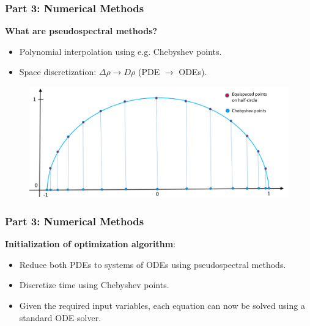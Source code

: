 \documentclass[aspectratio=169,xcolor=dvipsnames]{beamer}
\begin{document}
\begin{frame}
	\frametitle{Part 3: Numerical Methods}
	\textbf{What are pseudospectral methods?}\\
	\begin{itemize}
		\item Polynomial interpolation using e.g. Chebyshev points.
		\item Space discretization: $\Delta \rho \to D \rho$ (PDE $\to$ ODEs).
	\end{itemize}	
	\begin{figure}
		\includegraphics[width=12cm]{chebnodes1.png}\\
	\end{figure}

\end{frame}

\begin{frame}
	\frametitle{Part 3: Numerical Methods}
	\textbf{Initialization of optimization algorithm}:\\
	\vspace{0.3 cm}
    \begin{itemize}
    	\item Reduce both PDEs to systems of ODEs using pseudospectral methods.
    	\item Discretize time using Chebyshev points.
    	\item Given the required input variables, each equation can now be solved using a standard ODE solver.
    \end{itemize}
	
\end{frame}
\end{document}
